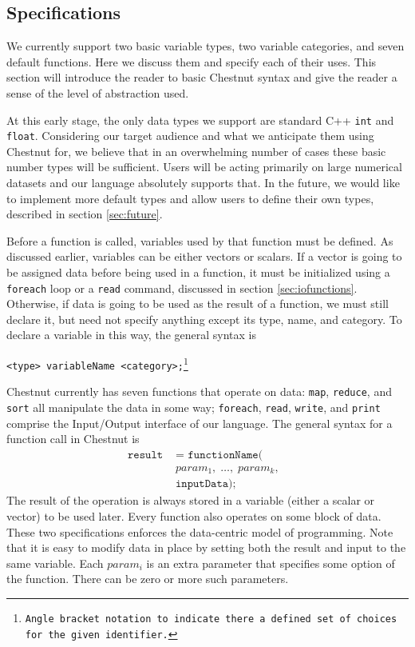 \documentclass[twocolumn]{article}
\renewcommand{\|}{\origbar} %
\newcommand{\code}[1]{\texttt{#1}}
\begin{document}
\subsection{Specifications}
\label{sec:specifications}

We currently support two basic variable types, two variable categories, and seven default functions. Here we discuss them and specify each of their uses. This section will introduce the reader to basic Chestnut syntax and give the reader a sense of the level of abstraction used.

At this early stage, the only data types we support are standard C++ \code{int} and \code{float}. Considering our target audience and what we anticipate them using Chestnut for, we believe that in an overwhelming number of cases these basic number types will be sufficient. Users will be acting primarily on large numerical datasets and our language absolutely supports that. In the future, we would like to implement more default types and allow users to define their own types, described in section \ref{sec:future}. 

Before a function is called, variables used by that function must be defined. As discussed earlier, variables can be either vectors or scalars. If a vector is going to be assigned data before being used in a function, it must be initialized using a \code{foreach} loop or a \code{read} command, discussed in section \ref{sec:iofunctions}. Otherwise, if data is going to be used as the result of a function, we must still declare it, but need not specify anything except its type, name, and category. To declare a variable in this way, the general syntax is
\begin{center}
  \code{<type> variableName <category>;\footnote{Angle bracket notation to indicate there a defined set of choices for the given identifier.}}
\end{center}

Chestnut currently has seven functions that operate on data: \code{map}, \code{reduce}, and \code{sort} all manipulate the data in some way; \code{foreach}, \code{read}, \code{write}, and \code{print} comprise the Input/Output interface of our language. The general syntax for a function call in Chestnut is
\begin{align*}
  \code{result } &\code{= functionName(} \\ &\code{$param_1,\;\ldots, \;param_k,$ } \\ &\code{inputData);}
\end{align*}
The result of the operation is always stored in a variable (either a scalar or vector) to be used later. Every function also operates on some block of data. These two specifications enforces the data-centric model of programming. Note that it is easy to modify data in place by setting both the result and input to the same variable. Each $param_i$ is an extra parameter that specifies some option of the function. There can be zero or more such parameters. 
\end{document}
